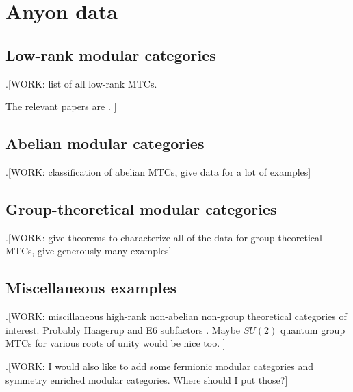 \section{Anyon data}

\subsection{Low-rank modular categories}

.[WORK: list of all low-rank MTCs.

The relevant papers are \cite{rowell2009classification, bruillard2016classification}.
]

\subsection{Abelian modular categories}

.[WORK: classification of abelian MTCs, give data for a lot of examples]

\subsection{Group-theoretical modular categories}

.[WORK: give theorems to characterize all of the data for group-theoretical MTCs, give generously many examples]

\subsection{Miscellaneous examples}

.[WORK: miscillaneous high-rank non-abelian non-group theoretical categories of interest. Probably Haagerup and E6 subfactors \cite{hong2008exotic}. Maybe $SU(2)$ quantum group MTCs for various roots of unity would be nice too.
]

.[WORK: I would also like to add some fermionic modular categories and symmetry enriched modular categories. Where should I put those?]